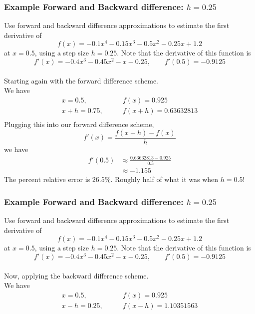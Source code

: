 \documentclass{if-beamer}
\begin{document}
\begin{frame}
\frametitle{Example Forward and Backward difference: $h= 0.25$}
Use forward and backward difference approximations to estimate the first derivative of
$$f(x) = -0.1x^4-0.15x^3-0.5x^2-0.25x+1.2 $$
at $x=0.5$, using a step size $h = 0.25$. Note that the derivative of this function is
$$f'(x) = -0.4x^3-0.45x^2-x-0.25, \qquad f'(0.5) = -0.9125$$
\\\vspace{5pt}
Starting again with the forward difference scheme.\\\vspace{5pt}
We have
\begin{align*}
x = 0.5, \qquad &f(x) = 0.925\\
x+h = 0.75, \qquad &f(x+h) = 0.63632813\\
\end{align*}
Plugging this into our forward difference scheme, 
$$f'(x) = \frac{f(x+h)-f(x)}{h} $$
we have
\begin{align*}
f'(0.5) &\approx \frac{0.63632813-0.925}{0.5} \\
&\approx -1.155
\end{align*}
The percent relative error is $26.5\%$. Roughly half of what it was when $h=0.5$!
\end{frame}


\begin{frame}
\frametitle{Example Forward and Backward difference: $h= 0.25$}
Use forward and backward difference approximations to estimate the first derivative of
$$f(x) = -0.1x^4-0.15x^3-0.5x^2-0.25x+1.2 $$
at $x=0.5$, using a step size $h = 0.25$. Note that the derivative of this function is
$$f'(x) = -0.4x^3-0.45x^2-x-0.25, \qquad f'(0.5) = -0.9125$$
\\\vspace{5pt}
Now, applying the backward difference scheme.\\\vspace{5pt}
We have
\begin{align*}
x = 0.5, \qquad &f(x) = 0.925\\
x-h = 0.25, \qquad &f(x-h) = 1.10351563\\
\end{align*}
\end{frame}
\end{document}
